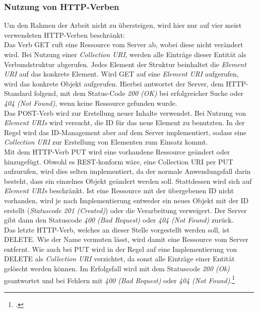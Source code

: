 \subsubsection*{Nutzung von HTTP-Verben}
Um den Rahmen der Arbeit nicht zu übersteigen, wird hier nur auf vier meist verwendeten \ac{HTTP}-Verben beschränkt:\\
Das Verb GET ruft eine Ressource vom Server ab, wobei diese nicht verändert wird. Bei Nutzung einer \textit{Collection \ac{URI}}, werden alle Einträge dieser Entität als Verbundstruktur abgerufen. Jedes Element der Struktur beinhaltet die \textit{Element URI} auf das konkrete Element. Wird GET auf eine \textit{Element URI} aufgerufen, wird das konkrete Objekt aufgerufen. Hierbei antwortet der Server, dem \ac{HTTP}-Standard folgend, mit dem Status-Code \textit{200 (OK)} bei erfolgreicher Suche oder \textit{404 (Not Found)}, wenn keine Ressource gefunden wurde.\\
Das POST-Verb wird zur Erstellung neuer Inhalte verwendet. Bei Nutzung von \textit{Element \ac{URI}s} wird versucht, die ID für das neue Element zu benutzten. In der Regel wird das ID-Management aber auf dem Server implementiert, sodass eine \textit{Collection \ac{URI}} zur Erstellung von Elementen zum Einsatz kommt.\\
Mit dem HTTP-Verb PUT wird eine vorhandene Ressource geändert oder hinzugefügt. Obwohl es \ac{REST}-konform wäre, eine Collection \ac{URI} per PUT aufzurufen, wird dies selten implementiert, da der normale Anwendungsfall darin besteht, dass ein einzelnes Objekt geändert werden soll. Stattdessen wird sich auf \textit{Element \ac{URI}s} beschränkt. Ist eine Ressource mit der übergebenen ID nicht vorhanden, wird je nach Implementierung entweder ein neues Objekt mit der ID erstellt (\textit{Statuscode 201 (Created)}) oder die Verarbeitung verweigert. Der Server gibt dann den Statuscode \textit{400 (Bad Request)} oder \textit{404 (Not Found)}  zurück. \\
Das letzte \ac{HTTP}-Verb, welches an dieser Stelle vorgestellt werden soll, ist DELETE. Wie der Name vermuten lässt, wird damit eine Ressource vom Server entfernt. Wie auch bei PUT wird in der Regel auf eine Implementierung von DELETE als \textit{Collection \ac{URI}} verzichtet, da sonst alle Einträge einer Entität gelöscht werden können. Im Erfolgsfall wird mit dem Statuscode \textit{200 (Ok)} geantwortet und bei Fehlern mit \textit{400 (Bad Request)} oder \textit{404 (Not Found)}.\footcite[S. 26ff.]{REST-und-HTTP}
